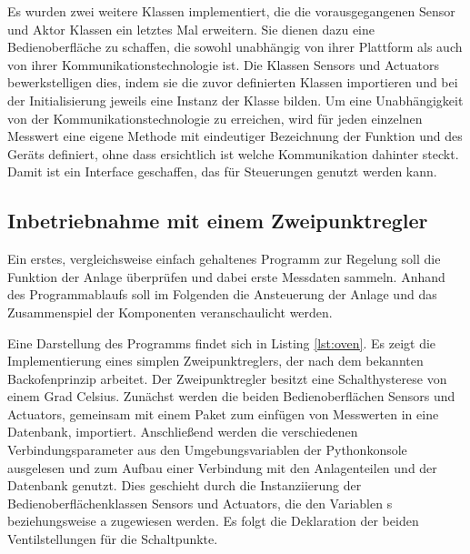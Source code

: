 

Es wurden zwei weitere Klassen implementiert, die die vorausgegangenen Sensor und Aktor Klassen ein letztes Mal erweitern. Sie dienen dazu eine Bedienoberfläche zu schaffen, die sowohl unabhängig von ihrer Plattform als auch von ihrer Kommunikationstechnologie ist. Die Klassen Sensors und Actuators bewerkstelligen dies, indem sie die zuvor definierten Klassen importieren und bei der Initialisierung jeweils eine Instanz der Klasse bilden. Um eine Unabhängigkeit von der Kommunikationstechnologie zu erreichen, wird für jeden einzelnen Messwert eine eigene Methode mit eindeutiger Bezeichnung der Funktion und des Geräts definiert, ohne dass ersichtlich ist welche Kommunikation dahinter steckt. Damit ist ein Interface geschaffen, das für Steuerungen genutzt werden kann.



\subsection{Inbetriebnahme mit einem Zweipunktregler}

Ein erstes, vergleichsweise einfach gehaltenes Programm zur Regelung soll die Funktion der Anlage überprüfen und dabei erste Messdaten sammeln. Anhand des Programmablaufs soll im Folgenden die Ansteuerung der Anlage und das Zusammenspiel der Komponenten veranschaulicht werden.

Eine Darstellung des Programms findet sich in Listing \ref{lst:oven}. Es zeigt die Implementierung eines simplen Zweipunktreglers, der nach dem bekannten Backofenprinzip arbeitet. Der Zweipunktregler besitzt eine Schalthysterese von einem Grad Celsius. Zunächst werden die beiden Bedienoberflächen Sensors und Actuators, gemeinsam mit einem Paket zum einfügen von Messwerten in eine Datenbank, importiert. Anschließend werden die verschiedenen Verbindungsparameter aus den Umgebungsvariablen der Pythonkonsole ausgelesen und zum Aufbau einer Verbindung mit den Anlagenteilen und der Datenbank genutzt. Dies geschieht durch die Instanziierung der Bedienoberflächenklassen Sensors und Actuators, die den Variablen s beziehungsweise a zugewiesen werden. Es folgt die Deklaration der beiden Ventilstellungen für die Schaltpunkte. 

